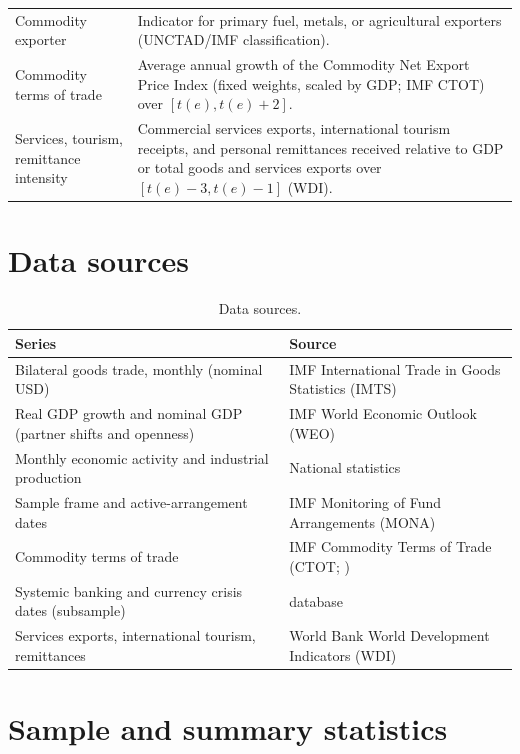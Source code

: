 \documentclass[12pt, a4paper]{article}
\begin{document}
\begin{table}[H]
\begin{tabularx}{\textwidth}{@{}lX@{}}
Commodity exporter & Indicator for primary fuel, metals, or agricultural exporters (UNCTAD/IMF classification). \\
Commodity terms of trade & Average annual growth of the Commodity Net Export Price Index (fixed weights, scaled by GDP; IMF CTOT) over $[t(e),t(e)+2]$. \\
Services, tourism, remittance intensity & Commercial services exports, international tourism receipts, and personal remittances received relative to GDP or total goods and services exports over $[t(e)-3,t(e)-1]$ (WDI). \\
\bottomrule
\end{tabularx}
\end{table}

\section{Data sources}\label{app:sources}

\begin{table}[H]
\centering\small
\caption{Data sources.}
\label{tab:sources}
\begin{tabularx}{\textwidth}{@{}lX@{}}
\toprule
Series & Source \\ \midrule
Bilateral goods trade, monthly (nominal USD) & IMF International Trade in Goods Statistics (IMTS) \\
Real GDP growth and nominal GDP (partner shifts and openness) & IMF World Economic Outlook (WEO) \\
Monthly economic activity and industrial production & National statistics \\
Sample frame and active-arrangement dates & IMF Monitoring of Fund Arrangements (MONA) \\
Commodity terms of trade & IMF Commodity Terms of Trade (CTOT; \citealt{gruss2019}) \\
Systemic banking and currency crisis dates (subsample) & \citet{laeven2020} database \\
Services exports, international tourism, remittances & World Bank World Development Indicators (WDI) \\
\bottomrule
\end{tabularx}
\end{table}

\section{Sample and summary statistics}\label{app:sample}
\end{document}
